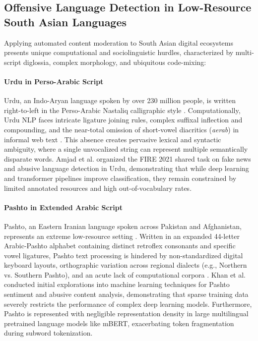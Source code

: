 \documentclass[11pt,a4paper]{article}
\begin{document}
\subsection{Offensive Language Detection in Low-Resource South Asian Languages}
Applying automated content moderation to South Asian digital ecosystems presents unique computational and sociolinguistic hurdles, characterized by multi-script diglossia, complex morphology, and ubiquitous code-mixing:

\paragraph{Urdu in Perso-Arabic Script}
Urdu, an Indo-Aryan language spoken by over 230 million people, is written right-to-left in the Perso-Arabic Nastaliq calligraphic style \cite{daud2017urdu}. Computationally, Urdu NLP faces intricate ligature joining rules, complex suffixal inflection and compounding, and the near-total omission of short-vowel diacritics (\textit{aerab}) in informal web text \cite{amjad2020overview}. This absence creates pervasive lexical and syntactic ambiguity, where a single unvocalized string can represent multiple semantically disparate words. Amjad et al. \cite{amjad2021urdu} organized the FIRE 2021 shared task on fake news and abusive language detection in Urdu, demonstrating that while deep learning and transformer pipelines improve classification, they remain constrained by limited annotated resources and high out-of-vocabulary rates.

\paragraph{Pashto in Extended Arabic Script}
Pashto, an Eastern Iranian language spoken across Pakistan and Afghanistan, represents an extreme low-resource setting \cite{kamran2010challenges}. Written in an expanded 44-letter Arabic-Pashto alphabet containing distinct retroflex consonants and specific vowel ligatures, Pashto text processing is hindered by non-standardized digital keyboard layouts, orthographic variation across regional dialects (e.g., Northern vs. Southern Pashto), and an acute lack of computational corpora \cite{kamran2010challenges,ahmad2020pashto}. Khan et al. \cite{khan2021pashto} conducted initial explorations into machine learning techniques for Pashto sentiment and abusive content analysis, demonstrating that sparse training data severely restricts the performance of complex deep learning models. Furthermore, Pashto is represented with negligible representation density in large multilingual pretrained language models like mBERT, exacerbating token fragmentation during subword tokenization.
\end{document}
